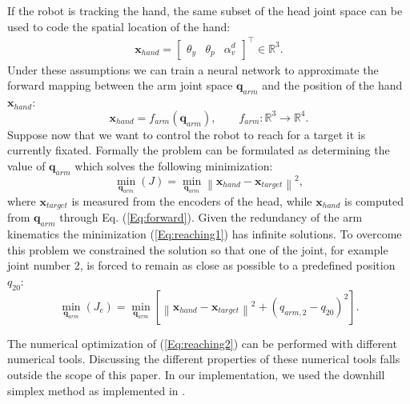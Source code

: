 If the robot is tracking the hand, the same subset of the head joint space can be used to code the spatial location of the hand:
%
\begin{eqnarray*}
\mathbf x_{hand}=
\begin{bmatrix} \theta_y & \theta_p & \alpha_v^d\end{bmatrix}^\top \in \mathbb R^3.
\end{eqnarray*}
%
Under these assumptions we can train a neural network to approximate the forward mapping between the arm joint space $\mathbf q_{arm}$ and the position of the hand $\mathbf x_{hand}$:
%
\begin{equation} 
\label{Eq:forward}
\mathbf x_{hand}=f_{arm}(\mathbf q_{arm}), \qquad f_{arm} : \mathbb R^3 \longrightarrow \mathbb R^4.\end{equation}
%
Suppose now that we want to control the robot to reach for a target it is currently 
fixated. Formally the problem can be formulated as determining the value of $\mathbf q_{arm}$ 
which solves the following minimization:
%
\begin{equation} 
\label{Eq:reaching1}
  \displaystyle\min_{\mathbf q_{arm}}\left(J\right)=\displaystyle\min_{\mathbf q_{arm}}
  \left\|\mathbf x_{hand} - \mathbf x_{target}\right\|^2,
\end{equation}
%
where $\mathbf x_{target}$ is measured from the encoders of the head, while 
$\mathbf x_{hand}$ is computed from $\mathbf q_{arm}$ through Eq. (\ref{Eq:forward}). Given the 
redundancy of the arm kinematics the minimization (\ref{Eq:reaching1}) has infinite solutions. To 
overcome this problem we constrained the solution so that one of the joint, for example 
joint number 2, is forced to remain as close as possible to a predefined position $q_{20}$:
%
\begin{equation} 
\label{Eq:reaching2}
  \displaystyle\min_{\mathbf q_{arm}}\left(J_c\right)=\displaystyle\min_{\mathbf q_{arm}}
  \left[
  \left\|\mathbf x_{hand} - \mathbf x_{target}\right\|^2 + \left(q_{arm,2}-q_{20}\right)^2
  \right].
\end{equation}

The numerical optimization of (\ref{Eq:reaching2}) can be performed with different 
numerical tools. Discussing the different properties of these numerical tools falls 
outside the scope of this paper. In our implementation, we used the downhill simplex 
method \cite{ne:Computer:65} as implemented in \cite{mo:Press:90}.

